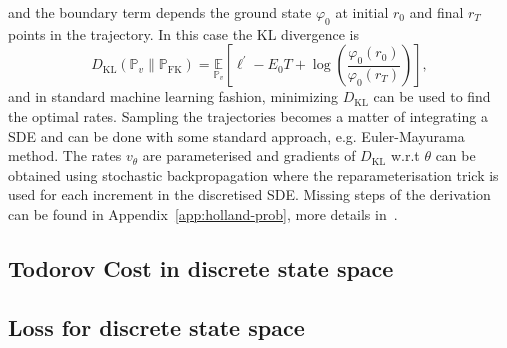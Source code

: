 and the boundary term depends the ground state $\varphi_0$ at initial $r_0$ and final $r_T$ points in the trajectory. In this case the KL divergence is 
\begin{equation}
	\label{eq:ltilde-cont}
	D_{\mathrm{KL}}\left(\mathbb{P}_{v} \| \mathbb{P}_{\mathrm{FK}}\right)=\underset{\mathbb{P}_{v}}{\mathbb{E}}\left[\ell^\prime-E_{0} T+\log \left(\frac{\varphi_{0}\left(r_{0}\right)}{\varphi_{0}\left(r_{T}\right)}\right)\right],
\end{equation}
and in standard machine learning fashion, minimizing $D_{\mathrm{KL}}$ can be used to find the optimal rates. Sampling the trajectories becomes a matter of integrating a SDE and can be done with some standard approach, e.g. Euler-Mayurama method. The rates $v_{\theta}$ are parameterised and gradients of $D_{\mathrm{KL}}$ w.r.t $\theta$ can be obtained using stochastic backpropagation where the reparameterisation trick is used for each increment in the discretised SDE. Missing steps of the derivation can be found in Appendix~\ref{app:holland-prob}, more details in~\cite{barr2020quantum}. 

\subsection{Todorov Cost in discrete state space}


\subsection{Loss for discrete state space}
\label{subsec:discrete_loss}



